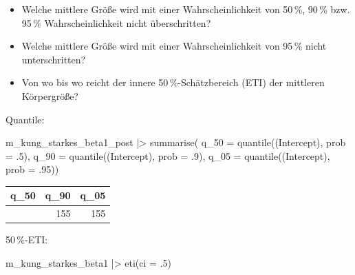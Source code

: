 \documentclass[
  ngerman,
  letterpaper,
  twoside,
  open=any]{scrbook}
\newenvironment{Shaded}{\begin{snugshade}}{\end{snugshade}}
\newcommand{\AttributeTok}[1]{\textcolor[rgb]{0.40,0.45,0.13}{#1}}
\newcommand{\DecValTok}[1]{\textcolor[rgb]{0.68,0.00,0.00}{#1}}
\newcommand{\FunctionTok}[1]{\textcolor[rgb]{0.28,0.35,0.67}{#1}}
\newcommand{\NormalTok}[1]{\textcolor[rgb]{0.00,0.23,0.31}{#1}}
\newcommand{\SpecialCharTok}[1]{\textcolor[rgb]{0.37,0.37,0.37}{#1}}
\newcommand{\StringTok}[1]{\textcolor[rgb]{0.13,0.47,0.30}{#1}}
\providecommand{\tightlist}{%
  \setlength{\itemsep}{0pt}\setlength{\parskip}{0pt}}\usepackage{longtable,booktabs,array}
\newcounter{none} %
\theoremstyle{definition}
\theoremstyle{plain}
\theoremstyle{definition}
\theoremstyle{definition}
\theoremstyle{definition}
\theoremstyle{definition}
\theoremstyle{remark}
\begin{document}
\footnotetext{\(\mu\)}

\begin{itemize}
\tightlist
\item
  Welche mittlere Größe wird mit einer Wahrscheinlichkeit von 50\,\%,
  90\,\% bzw. 95\,\% Wahrscheinlichkeit nicht überschritten?
\item
  Welche mittlere Größe wird mit einer Wahrscheinlichkeit von 95\,\%
  nicht unterschritten?
\item
  Von wo bis wo reicht der innere 50\,\%-Schätzbereich (ETI) der
  mittleren Körpergröße?
\end{itemize}

Quantile:

\begin{Shaded}
\begin{Highlighting}[]
\NormalTok{m\_kung\_starkes\_beta1\_post }\SpecialCharTok{|\textgreater{}} 
  \FunctionTok{summarise}\NormalTok{(}
    \AttributeTok{q\_50 =} \FunctionTok{quantile}\NormalTok{(}\StringTok{\textasciigrave{}}\AttributeTok{(Intercept)}\StringTok{\textasciigrave{}}\NormalTok{, }\AttributeTok{prob =}\NormalTok{ .}\DecValTok{5}\NormalTok{),}
    \AttributeTok{q\_90 =} \FunctionTok{quantile}\NormalTok{(}\StringTok{\textasciigrave{}}\AttributeTok{(Intercept)}\StringTok{\textasciigrave{}}\NormalTok{, }\AttributeTok{prob =}\NormalTok{ .}\DecValTok{9}\NormalTok{),}
    \AttributeTok{q\_05 =} \FunctionTok{quantile}\NormalTok{(}\StringTok{\textasciigrave{}}\AttributeTok{(Intercept)}\StringTok{\textasciigrave{}}\NormalTok{, }\AttributeTok{prob =}\NormalTok{ .}\DecValTok{95}\NormalTok{))}
\end{Highlighting}
\end{Shaded}

{\def\LTcaptype{none} %
\begin{longtable}[]{@{}rrr@{}}
\toprule\noalign{}
q\_50 & q\_90 & q\_05 \\
\midrule\noalign{}
\endhead
\bottomrule\noalign{}
\endlastfoot
155 & 155 & 155 \\
\end{longtable}
}

50\,\%-ETI:

\begin{Shaded}
\begin{Highlighting}[]
\NormalTok{m\_kung\_starkes\_beta1 }\SpecialCharTok{|\textgreater{}} 
  \FunctionTok{eti}\NormalTok{(}\AttributeTok{ci =}\NormalTok{ .}\DecValTok{5}\NormalTok{)}
\end{Highlighting}
\end{Shaded}
\end{document}
